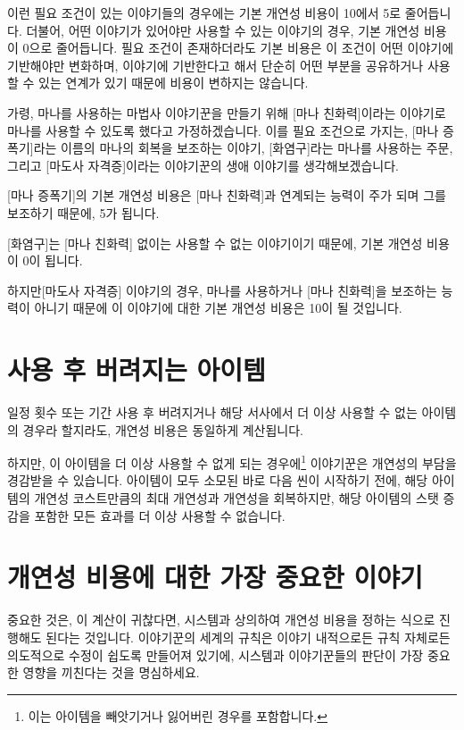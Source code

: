 \documentclass{report}
\begin{document}
	이런 필요 조건이 있는 이야기들의 경우에는 기본 개연성 비용이 10에서 5로 줄어듭니다. 더불어, 어떤 이야기가 있어야만 사용할 수 있는 이야기의 경우, 기본 개연성 비용이 0으로 줄어듭니다. 필요 조건이 존재하더라도 기본 비용은 이 조건이 어떤 이야기에 기반해야만 변화하며, 이야기에 기반한다고 해서 단순히 어떤 부분을 공유하거나 사용할 수 있는 연계가 있기 때문에 비용이 변하지는 않습니다.
	
	\smallskip
	
	가령, 마나를 사용하는 마법사 이야기꾼을 만들기 위해 [마나 친화력]이라는 이야기로 마나를 사용할 수 있도록 했다고 가정하겠습니다. 이를 필요 조건으로 가지는, [마나 증폭기]라는 이름의 마나의 회복을 보조하는 이야기, [화염구]라는 마나를 사용하는 주문, 그리고 [마도사 자격증]이라는 이야기꾼의 생애 이야기를 생각해보겠습니다.
	
	[마나 증폭기]의 기본 개연성 비용은 [마나 친화력]과 연계되는 능력이 주가 되며 그를 보조하기 때문에, 5가 됩니다.
	
	[화염구]는 [마나 친화력] 없이는 사용할 수 없는 이야기이기 때문에, 기본 개연성 비용이 0이 됩니다.
	
	하지만[마도사 자격증] 이야기의 경우, 마나를 사용하거나 [마나 친화력]을 보조하는 능력이 아니기 때문에 이 이야기에 대한 기본 개연성 비용은 10이 될 것입니다.
	
	\section*{사용 후 버려지는 아이템}
	일정 횟수 또는 기간 사용 후 버려지거나 해당 서사에서 더 이상 사용할 수 없는 아이템의 경우라 할지라도, 개연성 비용은 동일하게 계산됩니다.
	
	하지만, 이 아이템을 더 이상 사용할 수 없게 되는 경우에\footnote{이는 아이템을 빼앗기거나 잃어버린 경우를 포함합니다.} 이야기꾼은 개연성의 부담을 경감받을 수 있습니다. 아이템이 모두 소모된 바로 다음 씬이 시작하기 전에, 해당 아이템의 개연성 코스트만큼의 최대 개연성과 개연성을 회복하지만, 해당 아이템의 스탯 증감을 포함한 모든 효과를 더 이상 사용할 수 없습니다.
	
	\section*{개연성 비용에 대한 가장 중요한 이야기}
	중요한 것은, 이 계산이 귀찮다면, 시스템과 상의하여 개연성 비용을 정하는 식으로 진행해도 된다는 것입니다. 이야기꾼의 세계의 규칙은 이야기 내적으로든 규칙 자체로든 의도적으로 수정이 쉽도록 만들어져 있기에, 시스템과 이야기꾼들의 판단이 가장 중요한 영향을 끼친다는 것을 명심하세요.
	
\end{document}
